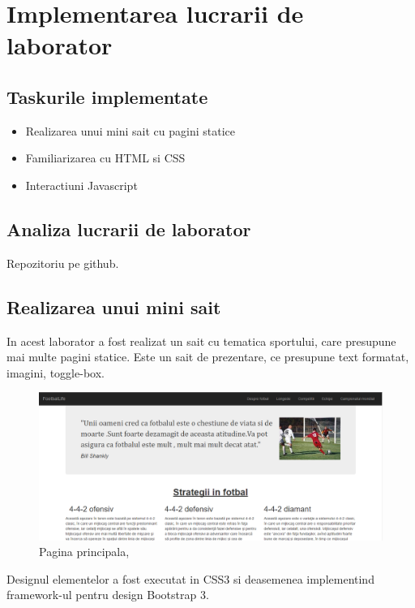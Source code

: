 \section{Implementarea lucrarii de laborator}

\subsection{Taskurile implementate}

\begin{itemize}
\item Realizarea unui mini sait cu pagini statice
\item Familiarizarea cu HTML si CSS
\item Interactiuni Javascript
\end{itemize}

\subsection{Analiza lucrarii de laborator}
Repozitoriu pe github.

\subsection{Realizarea unui mini sait }

In acest laborator a fost realizat un sait cu tematica sportului, care presupune mai 
multe pagini statice.
Este un sait de prezentare, ce presupune text formatat, imagini, toggle-box.


\begin{figure}[!ht]
                     \centering
                     \includegraphics[scale = 0.6]{index}
                     \caption{Pagina principala, \cite{ImRef}}
                     \label{Im_label}
                \end{figure}

\break
Designul elementelor a fost executat in CSS3 si deasemenea implementind 
framework-ul pentru design Bootstrap 3.

